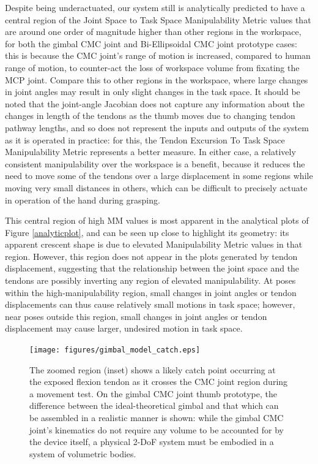 \documentclass[journal]{IEEEtran}
\begin{document}
Despite being underactuated, our system still is analytically predicted to have a central region of the Joint Space to Task Space Manipulability Metric values that are around one order of magnitude higher than other regions in the workspace, for both the gimbal CMC joint and Bi-Ellipsoidal CMC joint prototype cases: this is because the CMC joint's range of motion is increased, compared to human range of motion, to counter-act the loss of workspace volume from fixating the MCP joint. Compare this to other regions in the workspace, where large changes in joint angles may result in only slight changes in the task space. It should be noted that the joint-angle Jacobian does not capture any information about the changes in length of the tendons as the thumb moves due to changing tendon pathway lengths, and so does not represent the inputs and outputs of the system as it is operated in practice: for this, the Tendon Excursion To Task Space Manipulability Metric represents a better measure. In either case, a relatively consistent manipulability over the workspace is a benefit, because it reduces the need to move some of the tendons over a large displacement in some regions while moving very small distances in others, which can be difficult to precisely actuate in operation of the hand during grasping. %

This central region of high MM values is most apparent in the analytical plots of Figure \ref{analyticplot}, and can be seen up close to highlight its geometry: its apparent crescent shape is due to elevated Manipulability Metric values in that region. However, this region does not appear in the plots generated by tendon displacement, suggesting that the relationship between the joint space and the tendons are possibly inverting any region of elevated manipulability. At poses within the high-manipulability region, small changes in joint angles or tendon displacements can thus cause relatively small motions in task space; however, near poses outside this region, small changes in joint angles or tendon displacement may cause larger, undesired motion in task space. 

\begin{figure}
	\centering
	\texttt{[image: figures/gimbal\_model\_catch.eps]}\\
	
	\caption{The zoomed region (inset) shows a likely catch point occurring at the exposed flexion tendon as it crosses the CMC joint region during a movement test. On the gimbal CMC joint thumb prototype, the difference between the ideal-theoretical gimbal and that which can be assembled in a realistic manner is shown: while the gimbal CMC joint's kinematics do not require any volume to be accounted for by the device itself, a physical 2-DoF system must be embodied in a system of volumetric bodies. }
 \label{thumbcatch}
\end{figure}
\end{document}
